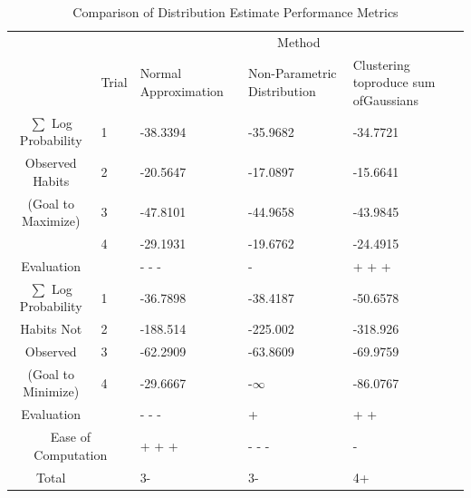\documentclass[11pt,letterpaper]{article}
\begin{document}
\pagebreak

\begin{table}[h!]
\caption{Comparison of Distribution Estimate Performance Metrics}
\begin{tabular}{| p{1.25in} | p{.25in} | p{1.25in} | p{1.25in} | p{1.25in} |}
\cline{3-5}
\multicolumn{2}{c}{}&\multicolumn{3}{|c|}{Method} \\
\cline{2-5}
\multicolumn{1}{c|}{}&\multicolumn{1}{|c|}{Trial}&Normal \newline Approximation&Non-Parametric \newline Distribution&Clustering to\newline produce sum of\newline Gaussians\\
\hline
\multicolumn{1}{|c|}{$\sum$ Log Probability} &1&-38.3394&-35.9682&-34.7721 \\
\cline{2-5}
\multicolumn{1}{|c|}{Observed Habits} &2&-20.5647&-17.0897&-15.6641 \\
\cline{2-5}
\multicolumn{1}{|c|}{(Goal to Maximize)} &3&-47.8101&-44.9658&-43.9845 \\
\cline{2-5}
\multicolumn{1}{|c|}{} &4&-29.1931&-19.6762&-24.4915 \\
\hline
\multicolumn{1}{|c}{Evaluation}&&- - -&-&+ + +\\
\hline
\multicolumn{1}{|c|}{$\sum$ Log Probability} &1&-36.7898&-38.4187&-50.6578\\
\cline{2-5}
\multicolumn{1}{|c|}{Habits Not} &2&-188.514&-225.002&-318.926 \\
\cline{2-5}
\multicolumn{1}{|c|}{Observed} &3&-62.2909&-63.8609&-69.9759 \\
\cline{2-5}
\multicolumn{1}{|c|}{(Goal to Minimize)} &4&-29.6667&-$\infty$&-86.0767 \\
\hline
\multicolumn{1}{|c}{Evaluation}&&- - -&+&+ +\\
\hline
\multicolumn{2}{|c|}{Ease of Computation} &+ + + &- - -&-\\
\hline \hline
\multicolumn{1}{|c}{Total}& &3- &3-&4+\\
\hline
\end{tabular}
\label{tab:pugh2}
\end{table}
\end{document}
